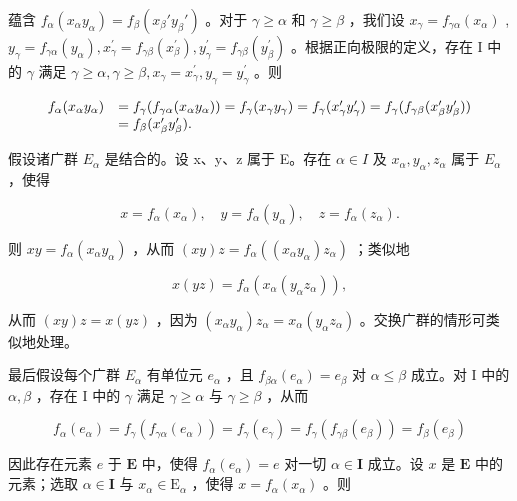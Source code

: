 蕴含 \(f_{\alpha}(x_{\alpha}y_{\alpha}) = f_{\beta}(x_{\beta}'y_{\beta}')\) 。对于 \(\gamma \geqslant \alpha\) 和 \(\gamma \geqslant \beta\) ，我们设 \(x_{\gamma} = f_{\gamma \alpha}(x_{\alpha})\) , \(y_{\gamma} = f_{\gamma \alpha}(y_{\alpha}), x_{\gamma}^{\prime} = f_{\gamma \beta}(x_{\beta}^{\prime}), y_{\gamma}^{\prime} = f_{\gamma \beta}(y_{\beta}^{\prime})\) 。根据正向极限的定义，存在 I 中的 \(\gamma\) 满足 \(\gamma \geqslant \alpha, \gamma \geqslant \beta, x_{\gamma} = x_{\gamma}^{\prime}, y_{\gamma} = y_{\gamma}^{\prime}\) 。则

\[
\begin{array}{r l} f _ {\alpha} (x _ {\alpha} y _ {\alpha}) & = f _ {\gamma} (f _ {\gamma \alpha} (x _ {\alpha} y _ {\alpha})) = f _ {\gamma} (x _ {\gamma} y _ {\gamma}) = f _ {\gamma} (x _ {\gamma} ^ {\prime} y _ {\gamma} ^ {\prime}) = f _ {\gamma} (f _ {\gamma \beta} (x _ {\beta} ^ {\prime} y _ {\beta} ^ {\prime})) \\ & = f _ {\beta} (x _ {\beta} ^ {\prime} y _ {\beta} ^ {\prime}). \end{array}
\]

假设诸广群 \(E_{\alpha}\) 是结合的。设 x、y、z 属于 E。存在 \(\alpha \in I\) 及 \(x_{\alpha}, y_{\alpha}, z_{\alpha}\) 属于 \(E_{\alpha}\) ，使得

\[
x = f _ {\alpha} (x _ {\alpha}), \quad y = f _ {\alpha} (y _ {\alpha}), \quad z = f _ {\alpha} (z _ {\alpha}).
\]

则 \(xy = f_{\alpha}(x_{\alpha}y_{\alpha})\) ，从而 \((xy)z = f_{\alpha}((x_{\alpha}y_{\alpha})z_{\alpha})\) ；类似地

\[
x (y z) = f _ {\alpha} \left(x _ {\alpha} \left(y _ {\alpha} z _ {\alpha}\right)\right),
\]

从而 \((xy)z = x(yz)\) ，因为 \((x_{\alpha}y_{\alpha})z_{\alpha} = x_{\alpha}(y_{\alpha}z_{\alpha})\) 。交换广群的情形可类似地处理。

最后假设每个广群 \(E_{\alpha}\) 有单位元 \(e_{\alpha}\) ，且 \(f_{\beta\alpha}(e_{\alpha}) = e_{\beta}\) 对 \(\alpha \leqslant \beta\) 成立。对 I 中的 \(\alpha, \beta\) ，存在 I 中的 \(\gamma\) 满足 \(\gamma \geqslant \alpha\) 与 \(\gamma \geqslant \beta\) ，从而

\[
f _ {\alpha} (e _ {\alpha}) = f _ {\gamma} \left(f _ {\gamma \alpha} (e _ {\alpha})\right) = f _ {\gamma} (e _ {\gamma}) = f _ {\gamma} \left(f _ {\gamma \beta} (e _ {\beta})\right) = f _ {\beta} (e _ {\beta})
\]

因此存在元素 \(e\) 于 \(\mathbf{E}\) 中，使得 \(f_{\alpha}(e_{\alpha}) = e\) 对一切 \(\alpha \in \mathbf{I}\) 成立。设 \(x\) 是 \(\mathbf{E}\) 中的元素；选取 \(\alpha \in \mathbf{I}\) 与 \(x_{\alpha} \in \mathrm{E}_{\alpha}\) ，使得 \(x = f_{\alpha}(x_{\alpha})\) 。则

